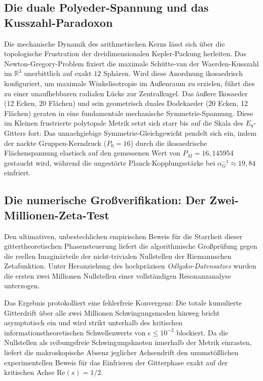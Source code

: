 \documentclass[11pt,a4paper]{article}
\newcommand{\R}{\mathbb{R}}
\newcommand{\Eoct}{E_8}
\theoremstyle{definition}
\begin{document}
	\subsection{Die duale Polyeder-Spannung und das Kusszahl-Paradoxon}
	Die mechanische Dynamik des arithmetischen Kerns lässt sich über die topologische Frustration der dreidimensionalen Kepler-Packung herleiten. Das Newton-Gregory-Problem fixiert die maximale Schütte-van der Waerden-Kusszahl im $\R^3$ unerbittlich auf exakt $12$ Sphären. Wird diese Anordnung ikosaedrisch konfiguriert, um maximale Winkelisotropie im Außenraum zu erzielen, führt dies zu einer unaufhebbaren radialen Lücke zur Zentralkugel. Das äußere Ikosaeder (12 Ecken, 20 Flächen) und sein geometrisch duales Dodekaeder (20 Ecken, 12 Flächen) geraten in eine fundamentale mechanische Symmetrie-Spannung. Diese im Kleinen frustrierte polytopale Metrik setzt sich starr bis auf die Skala des $\Eoct$-Gitters fort: Das unnachgiebige Symmetrie-Gleichgewicht pendelt sich ein, indem der nackte Gruppen-Kerndruck ($P_0 = 16$) durch die ikosaedrische Flächenspannung elastisch auf den gemessenen Wert von $P_M = 16{,}145954$ gestaucht wird, während die ungestörte Planck-Kopplungsstärke bei $\alpha_G^{-1} \approx 19{,}84$ einfriert.
	
	\subsection{Die numerische Großverifikation: Der Zwei-Millionen-Zeta-Test}
	Den ultimativen, unbestechlichen empirischen Beweis für die Starrheit dieser gittertheoretischen Phasensteuerung liefert die algorithmische Großprüfung gegen die reellen Imaginärteile der nicht-trivialen Nullstellen der Riemannschen Zetafunktion. Unter Heranziehung des hochpräzisen \textit{Odlyzko-Datensatzes} wurden die ersten zwei Millionen Nullstellen einer vollständigen Resonanzanalyse unterzogen. 
	
	Das Ergebnis protokolliert eine fehlerfreie Konvergenz: Die totale kumulierte Gitterdrift über alle zwei Millionen Schwingungsmoden hinweg bricht asymptotisch ein und wird strikt unterhalb des kritischen informationstheoretischen Schwellenwerts von $\epsilon \le 10^{-2}$ blockiert. Da die Nullstellen als reibungsfreie Schwingungsknoten innerhalb der Metrik einrasten, liefert die makroskopische Absenz jeglicher Achsendrift den unumstößlichen experimentellen Beweis für das Einfrieren der Gitterphase exakt auf der kritischen Achse $\text{Re}(s) = 1/2$.
	
\end{document}
